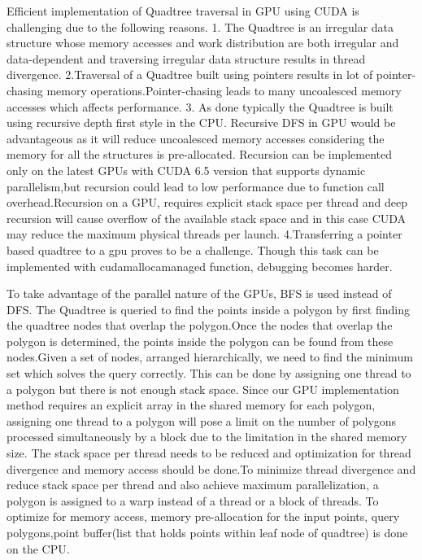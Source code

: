\documentclass{article}
\begin{document}
Efficient implementation of Quadtree traversal in GPU using CUDA is challenging due to the following reasons. 1. The Quadtree is an irregular data structure whose memory accesses and work distribution are both irregular and data-dependent and traversing irregular data structure results in thread divergence.
2.Traversal of a Quadtree built using pointers results in lot of pointer-chasing memory operations.Pointer-chasing leads to many uncoalesced memory accesses which affects performance. 
3. As done typically the Quadtree is built using recursive depth first style in the CPU. Recursive DFS in GPU would be advantageous as it will reduce uncoalesced memory accesses considering the memory for all the structures is pre-allocated. Recursion can be implemented only on the latest GPUs with CUDA 6.5 version that supports dynamic parallelism,but recursion could lead to low performance due to function call overhead.Recursion on a GPU, requires explicit stack space per thread and deep recursion will cause overflow of the available stack space and in this case CUDA may reduce the maximum physical threads per launch.
4.Transferring a pointer based quadtree to a gpu proves to be a challenge. Though this task can be implemented with cudamallocamanaged function, debugging becomes harder.

To take advantage of the parallel nature of the GPUs, BFS is used instead of DFS.
The Quadtree is queried to find the points inside a polygon by first finding the quadtree nodes that overlap the polygon.Once the nodes that overlap the polygon is determined, the points inside the polygon can be found from these nodes.Given a set of nodes, arranged hierarchically, we need to find the minimum set which solves the query correctly. This can be done by assigning one thread to a polygon but there is not enough stack space. Since our GPU implementation method requires an explicit array in the shared memory for each polygon, assigning one thread to a polygon will pose a limit on the number of polygons processed simultaneously by a block due to the limitation in the shared memory size.
The stack space per thread needs to be reduced and optimization for thread divergence and memory access should be done.To minimize thread divergence and reduce stack space per thread and also achieve maximum parallelization, a polygon is assigned to a warp instead of a thread or a block of threads. To optimize for memory access, memory pre-allocation for the input points, query polygons,point buffer(list that holds points within leaf node of quadtree) is done on the CPU.
\end{document}
